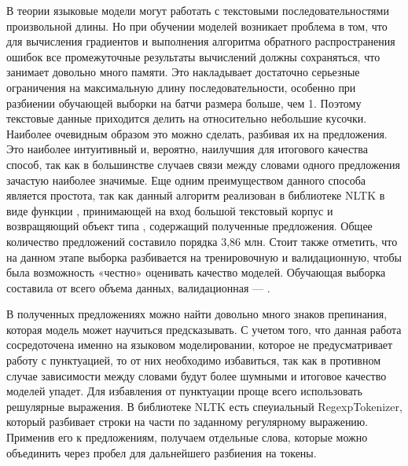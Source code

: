 В теории языковые модели могут работать с текстовыми последовательностями произвольной длины. Но при обучении моделей возникает проблема в том, что для вычисления градиентов и выполнения алгоритма обратного распространения ошибок все промежуточные результаты вычислений должны сохраняться, что занимает довольно много памяти. Это накладывает достаточно серьезные ограничения на максимальную длину последовательности, особенно при разбиении обучающей выборки на батчи размера больше, чем 1. Поэтому текстовые данные приходится делить на относительно небольшие кусочки. Наиболее очевидным образом это можно сделать, разбивая их на предложения. Это наиболее интуитивный и, вероятно, наилучшия для итогового качества способ, так как в большинстве случаев связи между словами одного предложения зачастую наиболее значимые. Еще одним преимуществом данного способа является простота, так как данный алгоритм реализован в библиотеке NLTK в виде функции , принимающей на вход большой текстовый корпус и возвращяющий объект типа , содержащий полученные предложения. Общее количество предложений составило порядка 3,86 млн. Стоит также отметить, что на данном этапе выборка разбивается на тренировочную и валидационную, чтобы была возможность «честно» оценивать качество моделей. Обучающая выборка составила  от всего объема данных, валидационная --- .

В полученных предложениях можно найти довольно много знаков препинания, которая модель может научиться предсказывать. С учетом того, что данная работа сосредоточена именно на языковом моделировании, которое не предусматривает работу с пунктуацией, то от них необходимо избавиться, так как в противном случае зависимости между словами будут более шумными и итоговое качество моделей упадет. Для избавления от пунктуации проще всего использовать решулярные выражения. В библиотеке NLTK есть спеуиальный RegexpTokenizer, который разбивает строки на части по заданному регулярному выражению. Применив его к предложениям, получаем отдельные слова, которые можно объединить через пробел для дальнейшего разбиения на токены.

